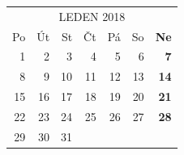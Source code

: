 \documentclass{article}
\begin{document}
\centering
\begin{table}[t!]
\centering
{}
\end{table}

\selectfont
\def\arraystretch{1.75}
\tabcolsep=10pt
\begin{tabular}{*6{r}>{\bfseries}r}
\multicolumn{7}{c}{LEDEN 2018}\\
\rowcolor[gray]{.75} Po & Út & St & Čt & Pá & So & Ne \\
\hline
                     1  & 2  & 3  & 4  & 5  & 6  & 7  \\
                     8  & 9  & 10 & 11 & 12 & 13 & 14 \\
                     15 & 16 & 17 & 18 & 19 & 20 & 21 \\
                     22 & 23 & 24 & 25 & 26 & 27 & 28 \\
                     29 & 30 & 31 &    &    &    &    \\
\end{tabular}

\newpage
\begin{table}[t!]
\centering
{}
\end{table}
\end{document}
